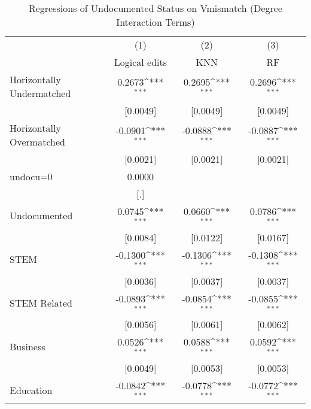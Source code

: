 \begin{table}[htbp]\centering
\def\sym#1{\ifmmode^{#1}\else\(^{#1}\)\fi}
\caption{Regressions of Undocumented Status on Vmismatch (Degree Interaction Terms)}
\begin{tabular}{l*{3}{c}}
\toprule
                    &\multicolumn{1}{c}{(1)}         &\multicolumn{1}{c}{(2)}         &\multicolumn{1}{c}{(3)}         \\
                    &Logical edits         &         KNN         &          RF         \\
\midrule
Horizontally Undermatched&      0.2673\sym{***}&      0.2695\sym{***}&      0.2696\sym{***}\\
                    &    [0.0049]         &    [0.0049]         &    [0.0049]         \\
\addlinespace
Horizontally Overmatched&     -0.0901\sym{***}&     -0.0888\sym{***}&     -0.0887\sym{***}\\
                    &    [0.0021]         &    [0.0021]         &    [0.0021]         \\
\addlinespace
undocu=0            &      0.0000         &                     &                     \\
                    &         [.]         &                     &                     \\
\addlinespace
Undocumented        &      0.0745\sym{***}&      0.0660\sym{***}&      0.0786\sym{***}\\
                    &    [0.0084]         &    [0.0122]         &    [0.0167]         \\
\addlinespace
STEM                &     -0.1300\sym{***}&     -0.1306\sym{***}&     -0.1308\sym{***}\\
                    &    [0.0036]         &    [0.0037]         &    [0.0037]         \\
\addlinespace
STEM Related        &     -0.0893\sym{***}&     -0.0854\sym{***}&     -0.0855\sym{***}\\
                    &    [0.0056]         &    [0.0061]         &    [0.0062]         \\
\addlinespace
Business            &      0.0526\sym{***}&      0.0588\sym{***}&      0.0592\sym{***}\\
                    &    [0.0049]         &    [0.0053]         &    [0.0053]         \\
\addlinespace
Education           &     -0.0842\sym{***}&     -0.0778\sym{***}&     -0.0772\sym{***}\\

\end{tabular}
\end{table}

